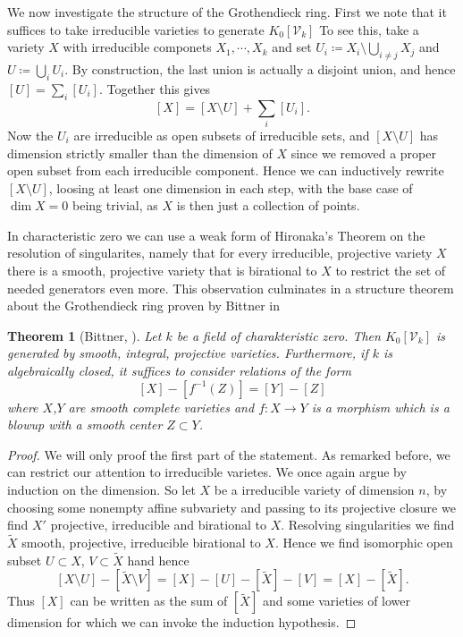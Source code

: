 \documentclass[11pt, a4paper, german]{article}
\theoremstyle{plain}
\newtheorem{theorem}{Theorem}
\theoremstyle{definition}
\newcommand{\gring}[1][k]{K_0[\mathcal{V}_#1]}
\begin{document}
We now investigate the structure of the Grothendieck ring. First we note that it suffices to take irreducible varieties to generate $\gring[k]$
To see this, take a variety $X$ with irreducible componets $X_1, \cdots, X_k$ and set ${U_i \coloneqq X_i \setminus \bigcup_{i \neq j} X_j}$ and
$U \coloneqq \bigcup_i U_i$. By construction, the last union is actually a disjoint union, and hence $[U] = \sum_i [U_i]$. Together this gives
\[
    [X] = [X \setminus U] + \sum_i [U_i].
\] Now the $U_i$ are irreducible as open subsets of irreducible sets, and $[X \setminus U]$ has dimension
strictly smaller than the dimension of $X$ since we removed a proper open subset from each irreducible component. Hence we can inductively
rewrite $[X \setminus U]$, loosing at least one dimension in each step, with the base case of $\dim  X = 0$ being trivial, as $X$ is then
just a collection of points.

In characteristic zero we can use a weak form of Hironaka's Theorem on the resolution of singularites, namely that for every irreducible, 
projective variety $X$ there is a smooth, projective variety that is birational to $X$ to restrict the set of needed generators even more. 
This observation culminates in a structure theorem about the Grothendieck ring proven by Bittner in \cite{Bittner}


\begin{theorem}[Bittner, {\cite[Thm. 3.1]{Bittner}}]
    Let $k$ be a field of charakteristic zero. Then $\gring[k]$ is generated by smooth, integral, projective varieties.
    Furthermore, if $k$ is algebraically closed, it suffices to consider relations of the form
    \[
        [X] - [f^{-1}(Z)] = [Y] - [Z]
    \]
    where $X$,$Y$ are smooth complete varieties and $f \colon X \to Y$ is a morphism which is a blowup with a smooth center $Z \subset Y$.     
\end{theorem}
\begin{proof}
    We will only proof the first part of the statement.
    As remarked before, we can restrict our attention to irreducible varietes.  We once again argue by induction on the dimension.
    So let $X$ be a irreducible variety of dimension $n$, by choosing some nonempty affine subvariety and passing to its projective closure we
    find $X'$ projective, irreducible and birational to $X$. Resolving singularities we find $\widetilde{X}$ smooth, projective, irreducible
    birational to $X$. Hence we find isomorphic open subset $U \subset X$, $V \subset \widetilde{X}$ hand hence
    \[
        [X \setminus U ] - [\widetilde{X} \setminus V] = [X] - [U] - [\widetilde{X}] - [V] = [X] - [\widetilde{X}].
    \]
    Thus $[X]$ can be written as the sum of $[\widetilde{X}]$ and some varieties of lower dimension for which we can invoke the induction
    hypothesis.
\end{proof}
\end{document}
